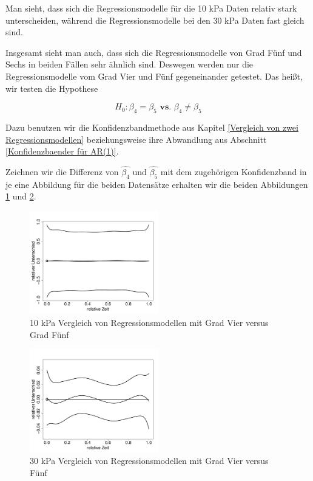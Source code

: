 \documentclass[12pt,a4paper]{article}
\theoremstyle{definition}
\theoremstyle{definition}
\theoremstyle{definition}
\theoremstyle{definition}
\begin{document}
Man sieht, dass sich die Regressionsmodelle für die 10 kPa Daten relativ stark unterscheiden, während die Regressionsmodelle bei den 30 kPa Daten fast gleich sind.

Insgesamt sieht man auch, dass sich die Regressionsmodelle von Grad Fünf und Sechs in beiden Fällen sehr ähnlich sind. Deswegen werden nur die Regressionsmodelle vom Grad Vier und Fünf gegeneinander getestet. Das heißt, wir testen die Hypothese

\begin{equation*}
H_0 : \beta_{4} = \beta_{5} \textbf{ vs. } \beta_4 \neq \beta_{5}
\end{equation*}

Dazu benutzen wir die Konfidenzbandmethode aus Kapitel \ref{Vergleich von zwei Regressionsmodellen} beziehungsweise ihre Abwandlung aus Abschnitt \ref{Konfidenzbaender für AR(1)}.

Zeichnen wir die Differenz von $\hat{\beta_4}$ und $\hat{\beta_5}$ mit dem zugehörigen Konfidenzband in je eine Abbildung für die beiden Datensätze erhalten wir die beiden Abbildungen \ref{10kPa-Regmod-4-5} und \ref{30kPa-Regmod-4-5}.

\begin{figure}[H] 
  \centering
     \includegraphics[width=0.5\textwidth]{10kPa-poly-KB-4-5.pdf}
  \caption{10 kPa Vergleich von Regressionsmodellen mit Grad Vier versus Grad Fünf}
  \label{10kPa-Regmod-4-5}
\end{figure}

\begin{figure}[H] 
  \centering
     \includegraphics[width=0.5\textwidth]{30kPa-poly-KB-4-5.pdf}
  \caption{30 kPa Vergleich von Regressionsmodellen mit Grad Vier versus Fünf}
  \label{30kPa-Regmod-4-5}
\end{figure}
\end{document}
